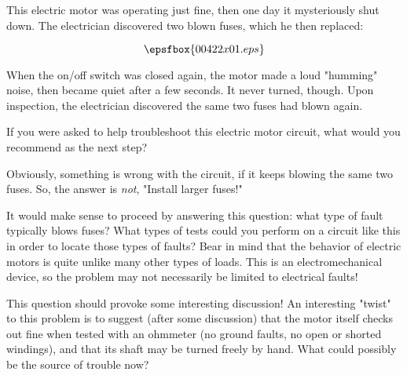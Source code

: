 

This electric motor was operating just fine, then one day it mysteriously shut down.  The electrician discovered two blown fuses, which he then replaced:

$$\epsfbox{00422x01.eps}$$

When the on/off switch was closed again, the motor made a loud "humming" noise, then became quiet after a few seconds.  It never turned, though.  Upon inspection, the electrician discovered the same two fuses had blown again.

If you were asked to help troubleshoot this electric motor circuit, what would you recommend as the next step?







Obviously, something is wrong with the circuit, if it keeps blowing the same two fuses.  So, the answer is {\it not}, "Install larger fuses!"

It would make sense to proceed by answering this question: what type of fault typically blows fuses?  What types of tests could you perform on a circuit like this in order to locate those types of faults?  Bear in mind that the behavior of electric motors is quite unlike many other types of loads.  This is an electromechanical device, so the problem may not necessarily be limited to electrical faults!







This question should provoke some interesting discussion!  An interesting "twist" to this problem is to suggest (after some discussion) that the motor itself checks out fine when tested with an ohmmeter (no ground faults, no open or shorted windings), and that its shaft may be turned freely by hand.  What could possibly be the source of trouble now?




